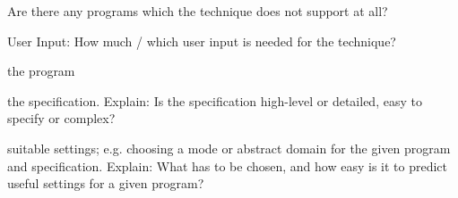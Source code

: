 \documentclass[a4paper]{article}
\begin{document}
\begin{minipage}[t]{0.16\linewidth}
\begin{betterlist}
\begin{betterlist}
\begin{betterlist}
			\end{betterlist}
			\item Are there any programs which the technique does not support at all?

		\end{betterlist}
		\item \alert{User Input:} How much / which user input is needed for the technique?
		\begin{betterlist}
			\item \checkboxChecked the program
			\item \checkboxHalfChecked the specification. Explain: Is the specification high-level or detailed, easy to specify or complex?

			\item \checkboxUnchecked suitable settings; e.g. choosing a mode or abstract domain for the given program and specification. Explain: What has to be chosen, and how easy is it to predict useful settings for a given program?


\end{betterlist}
\end{betterlist}
\end{minipage}
\end{document}
